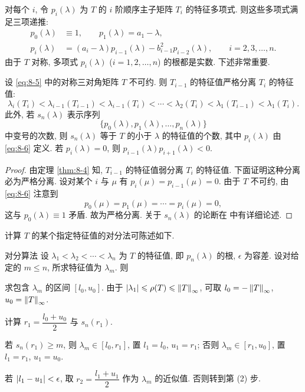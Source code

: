 对每个 $i$, 令 $p_i(\lambda)$ 为 $T$ 的 $i$ 阶顺序主子矩阵 $T_i$ 的特征多项式. 则这些多项式满足三项递推:
\begin{equation}
  \begin{aligned}
    p_0(\lambda)&\equiv1,\qquad p_1(\lambda)=a_1-\lambda,\\
    p_i(\lambda)&=(a_i-\lambda)p_{i-1}(\lambda)-b_{i-1}^2p_{i-2}(\lambda),
    \qquad i=2,3,\ldots,n.
  \end{aligned}
  \label{eq:8-6}
\end{equation}
由于 $T$ 对称, 多项式 $p_i(\lambda)$ ($i=1,2,\ldots,n$) 的根都是实数. 下述非常重要.

\begin{theorem}
\label{thm:8-7}
设 \eqref{eq:8-5} 中的对称三对角矩阵 $T$ 不可约. 则 $T_{i-1}$ 的特征值严格分离 $T_i$ 的特征值:
\[
  \lambda_i(T_i)<\lambda_{i-1}(T_{i-1})<\lambda_{i-1}(T_i)
  <\cdots<\lambda_2(T_i)<\lambda_1(T_{i-1})<\lambda_1(T_i).
\]
此外, 若 $s_n(\lambda)$ 表示序列
\[
  \{p_0(\lambda),p_1(\lambda),\ldots,p_n(\lambda)\}
\]
中变号的次数, 则 $s_n(\lambda)$ 等于 $T$ 的小于 $\lambda$ 的特征值的个数, 其中 $p_i(\lambda)$ 由 \eqref{eq:8-6} 定义. 若 $p_i(\lambda)=0$, 则 $p_{i-1}(\lambda)p_{i+1}(\lambda)<0$.
\end{theorem}

\begin{proof}
由定理 \ref{thm:8-4} 知, $T_{i-1}$ 的特征值弱分离 $T_i$ 的特征值. 下面证明这种分离必为严格分离. 设对某个 $i$ 与 $\mu$ 有 $p_i(\mu)=p_{i-1}(\mu)=0$. 由于 $T$ 不可约, 由 \eqref{eq:8-6} 注意到
\[
  p_0(\mu)=p_1(\mu)=\cdots=p_i(\mu)=0,
\]
这与 $p_0(\lambda)\equiv1$ 矛盾. 故为严格分离. 关于 $s_n(\lambda)$ 的论断在 \cite{src:95} 中有详细论述.
\end{proof}

计算 $T$ 的某个指定特征值的对分法可陈述如下.

\begin{algorithm}{对分算法}
  \label{alg:8-6}
  设 $\lambda_1<\lambda_2<\cdots<\lambda_n$ 为 $T$ 的特征值, 即 $p_n(\lambda)$ 的根, $\epsilon$ 为容差. 设对给定的 $m\leqslant n$, 所求特征值为 $\lambda_m$. 则
  \begin{parenlist}
    \item 求包含 $\lambda_m$ 的区间 $[l_0,u_0]$. 由于 $\left|\lambda_1\right|\leqslant\rho(T)\leqslant\left\|T\right\|_\infty$, 可取 $l_0=-\left\|T\right\|_\infty$, $u_0=\left\|T\right\|_\infty$.
    \item 计算 $r_1=\dfrac{l_0+u_0}{2}$ 与 $s_n(r_1)$.
    \item 若 $s_n(r_1)\geqslant m$, 则 $\lambda_m\in[l_0,r_1]$, 置 $l_1=l_0$, $u_1=r_1$; 否则 $\lambda_m\in[r_1,u_0]$, 置 $l_1=r_1$, $u_1=u_0$.
    \item 若 $\left|l_1-u_1\right|<\epsilon$, 取 $r_2=\dfrac{l_1+u_1}{2}$ 作为 $\lambda_m$ 的近似值. 否则转到第 (2) 步.
  \end{parenlist}
\end{algorithm}


